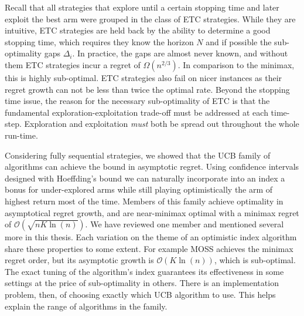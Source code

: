 \par Recall that all strategies that explore until a certain stopping time and later exploit the best arm were grouped in the class of ETC strategies. While they are intuitive, ETC strategies are held back by the ability to determine a good stopping time, which requires they know the horizon $N$ and if possible the sub-optimality gaps $\Delta_i$. In practice, the gaps are almost never known, and without them ETC strategies incur a regret of $\Omega(n^{2/3})$. In comparison to the minimax, this is highly sub-optimal. ETC strategies also fail on nicer instances as their regret growth can not be less than twice the optimal rate. Beyond the stopping time issue, the reason for the necessary sub-optimality of ETC is that the fundamental exploration-exploitation trade-off must be addressed at each time-step. Exploration and exploitation {\em must} both be spread out throughout the whole run-time. 

\par Considering fully sequential strategies, we showed that the UCB family of algorithms can achieve the \citet{lai-robbins:1985} bound in asymptotic regret. Using confidence intervals designed with Hoeffding's bound we can naturally incorporate into an index a bonus for under-explored arms while still playing optimistically the arm of highest return most of the time. Members of this family achieve optimality in asymptotical regret growth, and are near-minimax optimal with a minimax regret of $\mathcal{O}(\sqrt{nK\ln(n)})$. We have reviewed one member\cite{banditalgs:4} and mentioned several more\cite{lai-robbins:1985,auer:2002,bubeck:2009,Garivier:2011} in this thesis. Each variation on the theme of an optimistic index algorithm share these properties to some extent. For example MOSS\cite{bubeck:2009} achieves the minimax regret order, but its asymptotic growth is $\mathcal{O}(K\ln(n))$, which is sub-optimal. The exact tuning of the algorithm's index guarantees its effectiveness in some settings at the price of sub-optimality in others. There is an implementation problem, then, of choosing exactly which UCB algorithm to use. This helps explain the range of algorithms in the family. 

